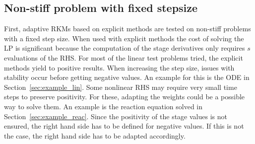\documentclass[a4paper]{article}
\numberwithin{equation}{section}
\theoremstyle{plain}
\theoremstyle{definition}
\numberwithin{theorem}{section}
\newcommand{\1}{\mathbbm{1}}
\begin{document}
\subsection{Non-stiff problem with fixed stepsize}\label{sec:Ex_expl}
First, adaptive RKMs based on explicit methods are tested on non-stiff problems with a fixed step size.
When used with explicit methods the cost of solving the LP is significant because the computation of the stage derivatives only requires $s$ evaluations of the RHS.
For most of the linear test problems tried, the explicit methods yield to positive results.
When increasing the step size, issues with stability occur before getting negative values.
An example for this is the ODE in Section~\ref{sec:example_lin}.
Some nonlinear RHS may require very small time steps to preserve positivity.
For these, adapting the weights could be a possible way to solve them.
An example is the reaction equation solved in Section~\ref{sec:example_reac}.
Since the positivity of the stage values is not ensured, the right hand side has to be defined for negative values. If this is not the case, the right hand side has to be adapted accordingly.
\end{document}
